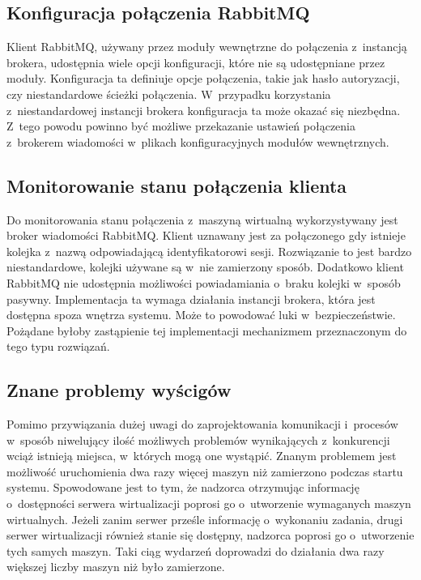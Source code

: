 \documentclass[../podsumowanie.tex]{subfiles}
\begin{document}
\subsection{Konfiguracja połączenia RabbitMQ}

Klient RabbitMQ, używany przez moduły wewnętrzne do połączenia z~instancją brokera, udostępnia wiele opcji konfiguracji, które nie są udostępniane przez moduły. Konfiguracja ta definiuje opcje połączenia, takie jak hasło autoryzacji, czy niestandardowe ścieżki połączenia. W~przypadku korzystania z~niestandardowej instancji brokera konfiguracja ta może okazać się niezbędna. Z~tego powodu powinno być możliwe przekazanie ustawień połączenia z~brokerem wiadomości w~plikach konfiguracyjnych modułów wewnętrznych.

\subsection{Monitorowanie stanu połączenia klienta}

Do monitorowania stanu połączenia z~maszyną wirtualną wykorzystywany jest broker wiadomości RabbitMQ. Klient uznawany jest za połączonego gdy istnieje kolejka z~nazwą odpowiadającą identyfikatorowi sesji. Rozwiązanie to jest bardzo niestandardowe, kolejki używane są w~nie zamierzony sposób. Dodatkowo klient RabbitMQ nie udostępnia możliwości powiadamiania o~braku kolejki w~sposób pasywny. Implementacja ta wymaga działania instancji brokera, która jest dostępna spoza wnętrza systemu. Może to powodować luki w~bezpieczeństwie. Pożądane byłoby zastąpienie tej implementacji mechanizmem przeznaczonym do tego typu rozwiązań.

\subsection{Znane problemy wyścigów}

Pomimo przywiązania dużej uwagi do zaprojektowania komunikacji i~procesów w~sposób niwelujący ilość możliwych problemów wynikających z~konkurencji wciąż istnieją miejsca, w~których mogą one wystąpić. Znanym problemem jest możliwość uruchomienia dwa razy więcej maszyn niż zamierzono podczas startu systemu. Spowodowane jest to tym, że nadzorca otrzymując informację o~dostępności serwera wirtualizacji poprosi go o~utworzenie wymaganych maszyn wirtualnych. Jeżeli zanim serwer prześle informację o~wykonaniu zadania, drugi serwer wirtualizacji również stanie się dostępny, nadzorca poprosi go o~utworzenie tych samych maszyn. Taki ciąg wydarzeń doprowadzi do działania dwa razy większej liczby maszyn niż było zamierzone.
\end{document}
